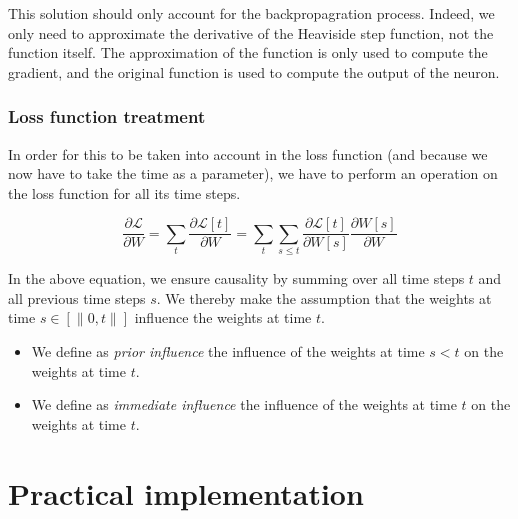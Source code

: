 \documentclass[11pt]{article}
\begin{document}
This solution should only account for the backpropagration process. Indeed, we only need to approximate the derivative of the Heaviside step function, not the function itself. The approximation of the function is only used to compute the gradient, and the original function is used to compute the output of the neuron.

\subsubsection{Loss function treatment}

In order for this to be taken into account in the loss function (and because we now have to take the time as a parameter), we have to perform an operation on the loss function for all its time steps.

\begin{equation}
  \frac{\partial \mathcal{L}}{\partial W}=\sum_t \frac{\partial\mathcal{L}[t]}{\partial W} =
  \sum_t \sum_{s\leq t} \frac{\partial\mathcal{L}[t]}{\partial W[s]}\frac{\partial W[s]}{\partial W}
\end{equation}

In the above equation, we ensure causality by summing over all time steps $t$ and all previous time steps $s$. We thereby make the assumption that the weights at time $s \in \left[\|0, t \|\right]$ influence the weights at time $t$.

\begin{itemize}
  \item We define as \textit{prior influence} the influence of the weights at time $s < t$ on the weights at time $t$.
  \item We define as \textit{immediate influence} the influence of the weights at time $t$ on the weights at time $t$.
\end{itemize}

\section{Practical implementation}

\pagebreak



\end{document}
